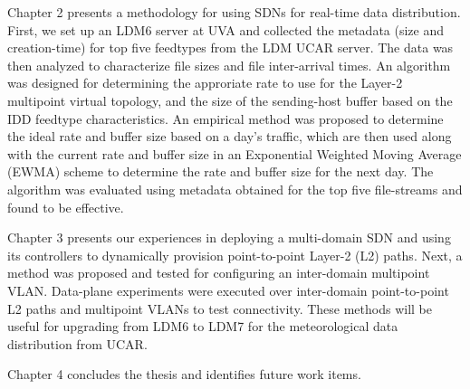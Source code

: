 Chapter 2 presents a methodology for using SDNs for real-time data distribution. First, we set up an LDM6 server at UVA
and collected the metadata (size and creation-time) for top five feedtypes from the LDM UCAR server. The data
was then analyzed to characterize file sizes and file inter-arrival times. An algorithm was designed for determining the 
approriate rate to use for the Layer-2 multipoint virtual topology, and the size of the sending-host buffer based on the IDD feedtype characteristics. An empirical method was proposed to determine the ideal rate and buffer size based on a day's traffic, which are then used along with the current rate and buffer size in an Exponential Weighted Moving Average (EWMA) scheme to determine the rate and buffer size for the next day. The algorithm was evaluated using metadata obtained for the top five file-streams and found to be effective.

Chapter 3 presents our experiences in deploying a multi-domain SDN and using its controllers to dynamically
 provision point-to-point Layer-2 (L2) paths. Next, a method was proposed and tested for configuring an inter-domain
 multipoint VLAN. Data-plane experiments were executed over inter-domain point-to-point L2 paths
 and multipoint VLANs to test connectivity. These methods will be useful for upgrading from LDM6 to
 LDM7 for the meteorological data distribution from UCAR.

Chapter 4 concludes the thesis and identifies future work items.




